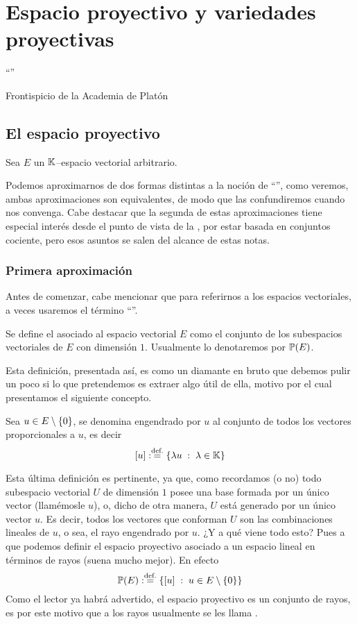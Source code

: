 \chapter{Espacio proyectivo y variedades proyectivas}
\label{epro}
\epigraph{``''}{Frontispicio de la Academia de Platón}

\section{El espacio proyectivo}
Sea $E$ un $\mathbb{K}$--espacio vectorial arbitrario.

Podemos aproximarnos de dos formas distintas a la noción de ``'', como veremos, ambas aproximaciones son equivalentes, de modo que las confundiremos cuando nos convenga. Cabe destacar que la segunda de estas aproximaciones tiene especial interés desde el punto de vista de la , por estar basada en conjuntos cociente, pero esos asuntos se salen del alcance de estas notas.
\subsection{Primera aproximación}
Antes de comenzar, cabe mencionar que para referirnos a los espacios vectoriales, a veces usaremos el término ``''.
\begin{defi}
	\label{epro_def_espacioProyectivo1}
	Se define el  asociado al espacio vectorial $E$ como el conjunto de los subespacios vectoriales de $E$ con dimensión $1$. Usualmente lo denotaremos por $\mathbb{P}(E)$.
\end{defi}
Esta definición, presentada así, es como un diamante en bruto que debemos pulir un poco si lo que pretendemos es extraer algo útil de ella, motivo por el cual presentamos el siguiente concepto.
\begin{defi}[Rayo]
	\label{epro_def_rayo}
	Sea $u\in E\setminus\{0\}$, se denomina  engendrado por $u$ al conjunto de todos los vectores proporcionales a $u$, es decir
	\begin{equation*}
		\left [ u \right ]:\stackrel{\textrm{def.}}{=}\{\lambda u\;:\; \lambda\in\mathbb{K}\}
	\end{equation*} 
\end{defi}
Esta última definición es pertinente, ya que, como recordamos (o no) todo subespacio vectorial $U$ de dimensión $1$ posee una base formada por un único vector (llamémosle $u$), o, dicho de otra manera, $U$ está generado por un único vector $u$. Es decir, todos los vectores que conforman $U$ son las combinaciones lineales de $u$, o sea, el rayo engendrado por $u$. ¿Y a qué viene todo esto? Pues a que podemos definir el espacio proyectivo asociado a un espacio lineal en términos de rayos (suena mucho mejor). En efecto
\begin{equation*}
	\mathbb{P}(E):\stackrel{\textrm{def.}}{=}\{\left [ u \right ]\;:\; u\in E\setminus\{0\}\}
\end{equation*}
Como el lector ya habrá advertido, el espacio proyectivo es un conjunto de rayos, es por este motivo que a los rayos usualmente se les llama .

